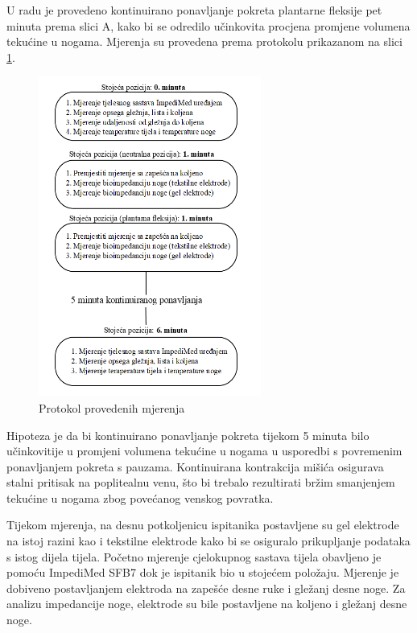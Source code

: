 \documentclass[../diplomski_rad.tex]{subfiles}
\begin{document}
U radu je provedeno kontinuirano ponavljanje pokreta plantarne fleksije pet minuta prema slici A, 
kako bi se odredilo učinkovita procjena promjene volumena tekućine u nogama. 
Mjerenja su provedena prema protokolu prikazanom na slici \ref{slk:protokol}.

\begin{figure}[htb]
    \centering
    \includegraphics[width=0.65\textwidth]{Figures/protokol.png} 
    \caption{Protokol provedenih mjerenja}
    \label{slk:protokol}
\end{figure}

Hipoteza je da bi kontinuirano ponavljanje pokreta tijekom 5 minuta bilo učinkovitije u promjeni volumena 
tekućine u nogama u usporedbi s povremenim ponavljanjem pokreta s pauzama. 
Kontinuirana kontrakcija mišića osigurava stalni pritisak na poplitealnu venu, 
što bi trebalo rezultirati bržim smanjenjem tekućine u nogama zbog povećanog venskog povratka.

Tijekom mjerenja, na desnu potkoljenicu ispitanika postavljene su gel elektrode na istoj razini kao i 
tekstilne elektrode kako bi se osiguralo prikupljanje podataka s istog dijela tijela. 
Početno mjerenje cjelokupnog sastava tijela obavljeno je pomoću ImpediMed SFB7 dok je ispitanik bio u stojećem položaju. 
Mjerenje je dobiveno postavljanjem elektroda na zapešće desne ruke i gležanj desne noge. 
Za analizu impedancije noge, elektrode su bile postavljene na koljeno i gležanj desne noge.
\end{document}
